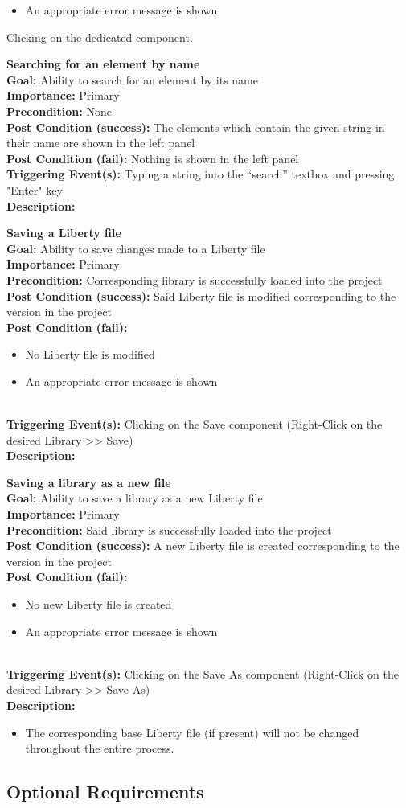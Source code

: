 \documentclass[10pt,a4paper]{report}
\newcommand{\precondition}[1]{
    \textbf{Precondition: } #1 \leavevmode \\
}
\newcommand{\FRDescription}[8]{
    \textbf{#1} \leavevmode \\
    \textbf{Goal: } #2 \leavevmode \\
    \textbf{Importance: } #3 \leavevmode \\
    \precondition{#4}
    \textbf{Post Condition (success): } #5 \leavevmode \\
    \textbf{Post Condition (fail): } #6 \leavevmode \\
    \textbf{Triggering Event(s): } #7 \leavevmode \\
    \textbf{Description: } \leavevmode \\ 
    #8}
\begin{document}
\begin{FR}
{\begin{itemize}
\begin{itemize}
        \end{itemize}
        \item An appropriate error message is shown
    \end{itemize}}
    {Clicking on the dedicated component.}
    \item \FRDescription{Searching for an element by name}
    {Ability to search for an element by its name}
    {Primary}
    {None}
    {The elements which contain the given string in their name are shown in the left panel}
    {Nothing is shown in the left panel}
    {Typing a string into the “search” textbox and pressing "Enter" key}
    \item \FRDescription{Saving a Liberty file}
    {Ability to save changes made to a Liberty file}
    {Primary}
    {Corresponding library is successfully loaded into the project}
    {Said Liberty file is modified corresponding to the version in the project}
    {\begin{itemize}
        \item No Liberty file is modified
        \item An appropriate error message is shown
    \end{itemize}}
    {Clicking on the Save component (Right-Click on the desired Library  >> Save)}
    \item \FRDescription{Saving a library as a new file}
    {Ability to save a library as a new Liberty file}
    {Primary}
    {Said library is successfully loaded into the project}
    {A new Liberty file is created corresponding to the version in the project}
    {\begin{itemize}
        \item No new Liberty file is created
        \item An appropriate error message is shown
    \end{itemize}}
    {Clicking on the Save As component (Right-Click on the desired Library  >> Save As)}
    {\begin{itemize}
        \item The corresponding base Liberty file (if present) will not be changed throughout the entire process.
    \end{itemize}}
\end{FR}

\subsection{Optional Requirements}
\end{document}
